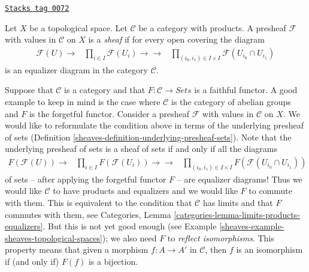 \begin{definition}
\label{sheaves-definition-sheaf-values-in-category}
\href{https://stacks.math.columbia.edu/tag/0072}{\texttt{Stacks tag 0072}}

Let $X$ be a topological space. Let $\mathcal{C}$ be
a category with products. A presheaf $\mathcal{F}$ with
values in $\mathcal{C}$ on $X$ is a {\it sheaf}
if for every open covering the diagram
$$
\begin{array}{ccc}\mathcal{F}(U) \longrightarrow & \prod\nolimits_{i\in I}
\mathcal{F}(U_i)
\longrightarrow\longrightarrow & \prod\nolimits_{(i_0, i_1) \in I \times I}
\mathcal{F}(U_{i_0} \cap U_{i_1})\end{array}
$$
is an equalizer diagram in the category $\mathcal{C}$.
\end{definition}

Suppose that $\mathcal{C}$ is a category and that
$F : \mathcal{C} \to \textit{Sets}$ is a faithful functor.
A good example to keep in mind is the case where $\mathcal{C}$
is the category of abelian groups and $F$ is the forgetful functor.
Consider a presheaf $\mathcal{F}$ with values in $\mathcal{C}$ on $X$.
We would like to reformulate the condition above in terms
of the underlying presheaf of sets
(Definition \ref{sheaves-definition-underlying-presheaf-sets}).
Note that the underlying
presheaf of sets is a sheaf of sets if and only if all the
diagrams
$$
\begin{array}{ccc}F(\mathcal{F}(U)) \longrightarrow & \prod\nolimits_{i\in I}
F(\mathcal{F}(U_i))
\longrightarrow\longrightarrow & \prod\nolimits_{(i_0, i_1) \in I \times I}
F(\mathcal{F}(U_{i_0} \cap U_{i_1}))\end{array}
$$
of sets -- after applying the forgetful functor $F$ -- are
equalizer diagrams! Thus we would like $\mathcal{C}$ to have
products and equalizers and we would like $F$ to commute with
them. This is equivalent to the condition that $\mathcal{C}$
has limits and that $F$ commutes with them, see
Categories, Lemma \ref{categories-lemma-limits-products-equalizers}.
But this is not yet good enough
(see Example \ref{sheaves-example-sheaves-topological-spaces});
we also need $F$ to {\it reflect isomorphisms}.
This property means that given a morphism
$f : A \to A'$ in $\mathcal{C}$, then $f$ is
an isomorphism if (and only if) $F(f)$ is a bijection.

